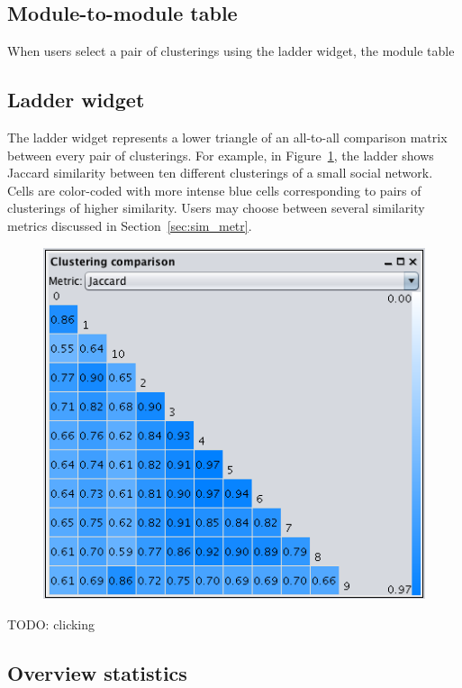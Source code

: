 \subsection{Module-to-module table}

When users select a pair of clusterings using the ladder widget, the module 
table

\subsection{Ladder widget}


The ladder widget represents a lower triangle of an all-to-all comparison 
matrix between every pair of clusterings. For example, in 
Figure~\ref{fig:ladder}, the ladder shows Jaccard similarity between ten 
different clusterings of a small social network. Cells are color-coded with more
intense blue cells corresponding to pairs of clusterings of higher similarity.
Users may choose between several similarity metrics discussed in 
Section~\ref{sec:sim_metr}.

\begin{figure}
  \centering
  \includegraphics[width=0.3\linewidth]{ladder.png}
  \caption{}
  \label{fig:ladder}
\end{figure}

TODO: clicking


\subsection{Overview statistics}
\label{sec:stats}

